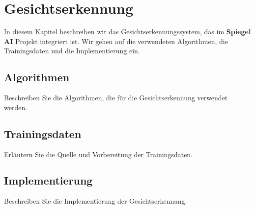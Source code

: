 \chapter{Gesichtserkennung}

In diesem Kapitel beschreiben wir das Gesichtserkennungssystem, das im \textbf{Spiegel AI} Projekt integriert ist. Wir gehen auf die verwendeten Algorithmen, die Trainingsdaten und die Implementierung ein.

\section{Algorithmen}
Beschreiben Sie die Algorithmen, die für die Gesichtserkennung verwendet werden.

\section{Trainingsdaten}
Erläutern Sie die Quelle und Vorbereitung der Trainingsdaten.

\section{Implementierung}
Beschreiben Sie die Implementierung der Gesichtserkennung.
